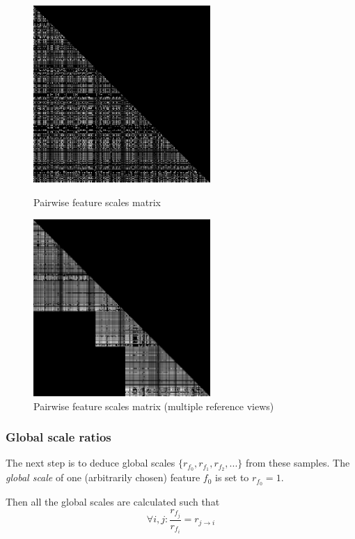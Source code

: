 \documentclass[11pt]{scrreprt}
\begin{document}
\begin{figure}
\centering
\includegraphics[width=0.6\textwidth]{ratios.png}
\caption{Pairwise feature scales matrix}
\label{fig:ratios}

\vspace{1cm}

\includegraphics[width=0.6\textwidth]{ratios_multiref.png}
\caption{Pairwise feature scales matrix (multiple reference views)}
\label{fig:ratios_multiref}
\end{figure}


\subsubsection{Global scale ratios}
The next step is to deduce global scales $\{ r_{f_0}, r_{f_1}, r_{f_2}, ... \}$ from these samples. The \emph{global scale} of one (arbitrarily chosen) feature $f_0$ is set to $r_{f_0} = 1$.

Then all the global scales are calculated such that
\begin{equation*}
\forall i,j : \frac{r_{f_j}}{r_{f_i}} = r_{j\rightarrow i}
\end{equation*}
\end{document}
